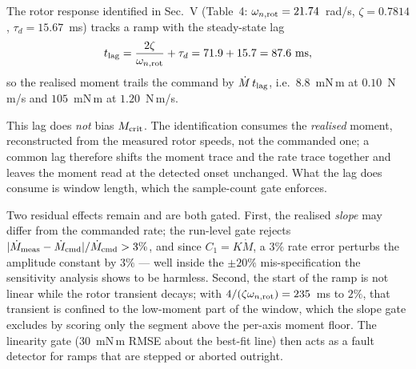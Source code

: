 \documentclass[10pt]{article}
\begin{document}
The rotor response identified in Sec.~V (Table~4:
$\omega_{n,\rm rot} = 21.74$~rad/s, $\zeta = 0.7814$,
$\tau_d = 15.67$~ms) tracks a ramp with the steady-state lag
\[
  t_{\rm lag} = \frac{2\zeta}{\omega_{n,\rm rot}} + \tau_d
  = 71.9 + 15.7 = 87.6~\text{ms},
\]
so the realised moment trails the command by
$\dot M\,t_{\rm lag}$, i.e.\ $8.8$~mN\,m at $0.10$~N\,m/s and
$105$~mN\,m at $1.20$~N\,m/s.

This lag does \emph{not} bias $M_{\rm crit}$.  The identification
consumes the \emph{realised} moment, reconstructed from the measured
rotor speeds, not the commanded one; a common lag therefore shifts the
moment trace and the rate trace together and leaves the moment read at
the detected onset unchanged.  What the lag does consume is window
length, which the sample-count gate enforces.

Two residual effects remain and are both gated.  First, the realised
\emph{slope} may differ from the commanded rate; the run-level gate
rejects $|\dot M_{\rm meas} - \dot M_{\rm cmd}|/\dot M_{\rm cmd} > 3\%$,
and since $C_1 = K\dot M$, a $3\%$ rate error perturbs the amplitude
constant by $3\%$ --- well inside the $\pm20\%$ mis-specification the
sensitivity analysis shows to be harmless.  Second, the start of the
ramp is not linear while the rotor transient decays; with
$4/(\zeta\omega_{n,\rm rot}) = 235$~ms to $2\%$, that transient is
confined to the low-moment part of the window, which the slope gate
excludes by scoring only the segment above the per-axis moment floor.
The linearity gate ($30$~mN\,m RMSE about the best-fit line) then acts
as a fault detector for ramps that are stepped or aborted outright.
\end{document}
